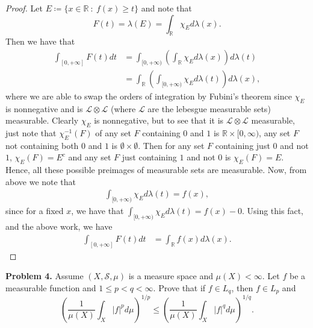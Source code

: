\documentclass[leqno]{article}
\theoremstyle{nonumberplain}
\newtheorem{proof}{Proof}
\newcommand{\R}{\mathbb{R}}
\newcommand{\Sets}{\mathcal{S}}
\begin{document}
\begin{proof}
Let $E\coloneqq \{x\in \R ~\colon ~ f(x)\geq t\}$ and note that
\[
F(t)=\lambda(E)=\int_\R \chi_E d\lambda(x).
\]
Then we have that
\begin{align*}
\int_{[0,+\infty]}F(t)dt&=\int_{[0,+\infty)} \left( \int_\R \chi_E d\lambda(x)\right)d\lambda(t)\\
&= \int_\R \left( \int_{[0,+\infty)} \chi_E d\lambda(t)\right)d\lambda(x),
\end{align*}
where we are able to swap the orders of integration by Fubini's theorem since $\chi_E$ is nonnegative and is $\mathcal{L}\otimes \mathcal{L}$ (where $\mathcal{L}$ are the lebesgue measurable sets) measurable. Clearly $\chi_E$ is nonnegative, but to see that it is $\mathcal{L}\otimes \mathcal{L}$ measurable, just note that $\chi_E^{-1}(F)$ of any set $F$ containing $0$ and $1$ is $\R\times [0,\infty)$, any set $F$ not containing both $0$ and $1$ is $\emptyset \times \emptyset$. Then for any set $F$ containing just $0$ and not $1$, $\chi_E(F)=E^c$ and any set $F$ just containing $1$ and not $0$ is $\chi_E(F)=E$. Hence, all these possible preimages of measurable sets are measurable.  Now, from above we note that
\begin{align*}
\int_{[0,+\infty)}\chi_E d\lambda(t)=f(x),
\end{align*}
since for a fixed $x$, we have that $\int_{[0,+\infty)}\chi_E d\lambda(t)=f(x)-0$. Using this fact, and the above work, we have
\begin{align*}
\int_{[0,+\infty]}F(t)dt&=\int_\R f(x) d\lambda(x).
\end{align*}
\end{proof}

\pagebreak




\noindent\textbf{Problem 4.} \quad
Assume $(X,\Sets,\mu)$ is a measure space and $\mu(X)<\infty$. Let $f$ be a measurable function and $1\leq p < q <\infty$. Prove that if $f\in L_q$, then $f\in L_p$ and
\[
\left( \frac{1}{\mu(X)}\int_X |f|^p d\mu\right)^{1/p} \leq \left(\frac{1}{\mu(X)}\int_X |f|^q d\mu\right)^{1/q}.
\]
\end{document}
